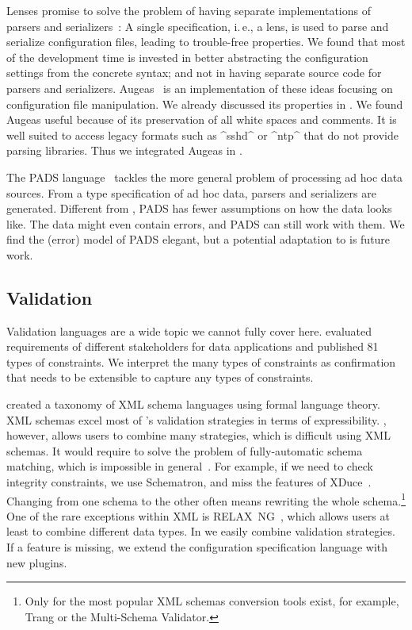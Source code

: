 Lenses promise to solve the problem of having separate implementations of parsers and serializers~\cite{foster2008boomerang,lutterkort2008augeas,ko2016bigul}:
A single specification, i.\,e., a lens, is used to parse and serialize configuration files, leading to trouble-free  properties.
We found that most of the development time is invested in better abstracting the configuration settings from the concrete syntax; and not in having separate source code for parsers and serializers.
Augeas~\cite{lutterkort2008augeas} is an implementation of these ideas focusing on configuration file manipulation.
We already discussed its properties in .
We found Augeas useful because of its preservation of all white spaces and comments.
It is well suited to access legacy formats such as ^sshd^ or ^ntp^ that do not provide parsing libraries.
Thus we integrated Augeas in \elektra{}.

The PADS language~\cite{fisher2005pads,fisher2010next,fisher2011pads} tackles the more general problem of processing ad hoc data sources.
From a type specification of ad hoc data, parsers and serializers are generated.
Different from \elektra{}, PADS has fewer assumptions on how the data looks like.
The data might even contain errors, and PADS can still work with them.
We find the (error) model of PADS elegant, but a potential adaptation to \elektra{} is future work.


\subsection{Validation}

Validation languages are a wide topic we cannot fully cover here.
\citet{hartmann2016validation} evaluated requirements of different stakeholders for data applications and published 81 types of constraints.
We interpret the many types of constraints as confirmation that \elektra{} needs to be extensible to capture any types of constraints.

\citet{murata2005taxonomy} created a taxonomy of XML schema languages using formal language theory.
XML schemas excel most of \elektra{}'s validation strategies in terms of expressibility.
\elektra{}, however, allows users to combine many strategies, which is difficult using XML schemas.
It would require to solve the problem of fully-automatic schema matching, which is impossible in general~\cite{batini1986comparative,do2003comparison,rahm2001survey}.
For example, if we need to check integrity constraints, we use Schematron, and miss the features of XDuce~\cite{hosoya2003xduce}.
Changing from one schema to the other often means rewriting the whole schema.\footnote{Only for the most popular XML schemas conversion tools exist, for example, Trang or the Multi-Schema Validator.}
One of the rare exceptions within XML is RELAX~NG~\cite{clark2002relax}, which allows users at least to combine different data types.
In \elektra{} we easily combine validation strategies.
If a feature is missing, we extend the configuration specification language with new plugins.

